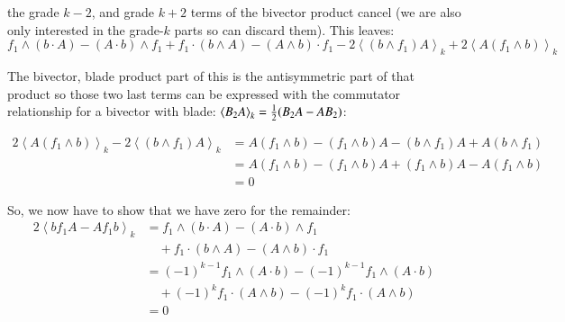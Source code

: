 \documentclass{article}
\newcommand{\gpgrade}[2] {{\left\langle{{#1}}\right\rangle}_{#2}}
\begin{document}
the grade $k-2$, and grade $k+2$ terms of the bivector product 
cancel (we are also only interested in the grade-$k$ parts so can discard them).  This leaves:
\begin{equation*}
f_1 \wedge (b \cdot A) - (A \cdot b) \wedge f_1
+ f_1 \cdot (b \wedge A) - (A \wedge b) \cdot f_1
- 2 \gpgrade{(b \wedge f_1) A}{k} 
+ 2 \gpgrade{A (f_1 \wedge b)}{k}
\end{equation*}

The bivector, blade product part of this is the antisymmetric part of that product so those two last terms can be expressed with the
commutator relationship for a bivector with blade: $\gpgrade{B_2 A}{k} = \inv{2}(B_2 A - A B_2)$:

\begin{align*}
2 \gpgrade{A (f_1 \wedge b)}{k}
- 2 \gpgrade{(b \wedge f_1) A}{k} 
&= A (f_1 \wedge b) - (f_1 \wedge b) A - (b \wedge f_1) A + A (b \wedge f_1) \\
&= A (f_1 \wedge b) - (f_1 \wedge b) A + (f_1 \wedge b) A - A (f_1 \wedge b) \\
&= 0
\end{align*}

So, we now have to show that we have zero for the remainder:
\begin{align*}
2 \gpgrade{ b f_1 A - A f_1 b}{k} 
&= f_1 \wedge (b \cdot A) - (A \cdot b) \wedge f_1 \\
&\quad + f_1 \cdot (b \wedge A) - (A \wedge b) \cdot f_1 \\
&= (-1)^{k-1}f_1 \wedge (A \cdot b) - (-1)^{k-1}f_1 \wedge (A \cdot b) \\
&\quad + (-1)^{k}f_1 \cdot (A \wedge b) - (-1)^{k} f_1 \cdot (A \wedge b) \\
&= 0
\end{align*}
\end{document}
